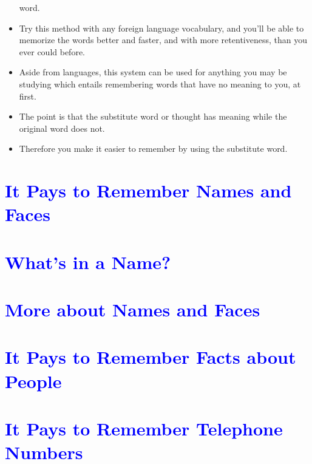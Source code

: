\begin{itemize}
            word.
            \item Try this method with any foreign language vocabulary,
            and you'll be able to memorize the words better and faster,
            and with more retentiveness, than you ever could before.
            \item Aside from languages, this system can be used for anything
            you may be studying which entails remembering words
            that have no meaning to you, at first.
            \item The point is that the substitute word or thought has
            meaning while the original word does not.
            \item Therefore you
            make it easier to remember by using the substitute word.
        \end{itemize}

    \section* {\textcolor{blue}{It Pays to Remember Names and Faces}}
    \section* {\textcolor{blue}{What's in a Name?}}
    \section* {\textcolor{blue}{More about Names and Faces}}
    \section* {\textcolor{blue}{It Pays to Remember Facts about People}}
    \section* {\textcolor{blue}{It Pays to Remember Telephone Numbers}}
